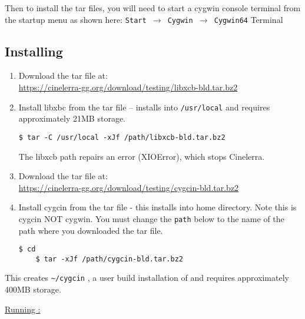 Then to install the \CGG{} tar files, you will need to start a cygwin console terminal from the startup menu as shown here:
	\texttt{Start $\rightarrow$ Cygwin $\rightarrow$ Cygwin64} Terminal

\subsection*{Installing \CGG{}}
\label{sec:installing_cinelerra}

\begin{enumerate}
	\item Download the tar file at:\\
	 {\small \url{https://cinelerra-gg.org/download/testing/libxcb-bld.tar.bz2}}
	\item Install libxbc from the tar file -- installs into \texttt{/usr/local} and requires approximately 21MB storage.
\begin{lstlisting}[numbers=none]
	$ tar -C /usr/local -xJf /path/libxcb-bld.tar.bz2
\end{lstlisting}
The libxcb path repairs an error (XIOError), which stops Cinelerra.
	\item Download the tar file at:\\
	{\small \url{https://cinelerra-gg.org/download/testing/cygcin-bld.tar.bz2}}	
	\item Install cygcin from the tar file - this installs into home directory.  Note this is cygcin NOT cygwin. You must change the \texttt{path} below to the name of the path where you downloaded the tar file.
\begin{lstlisting}[numbers=none]
	$ cd
	$ tar -xJf /path/cygcin-bld.tar.bz2
\end{lstlisting}
\end{enumerate}
This creates \texttt{\~{}/cygcin} , a user build installation of \CGG{} and requires approximately 400MB storage.

\underline{Running \CGG{}:}

